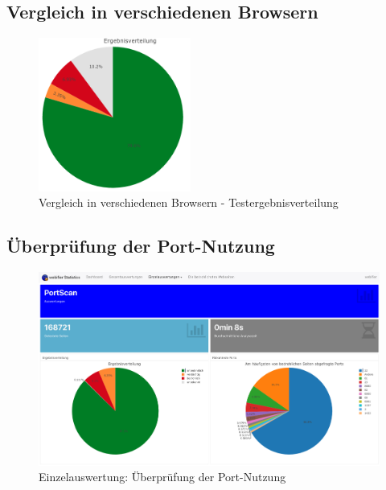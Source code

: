\subsection{Vergleich in verschiedenen Browsern}
\begin{figure}[H]
  \centering
  \includegraphics[width=5cm]{images/stats/diaheaderinspection}
  \caption{Vergleich in verschiedenen Browsern - Testergebnisverteilung}
  \label{fig:analyse-diaheaderinspection}
\end{figure}

\subsection{Überprüfung der Port-Nutzung}
\begin{figure}[H]
  \centering
  \includegraphics[width=15cm]{images/stats/portscan}
  \caption{Einzelauswertung: Überprüfung der Port-Nutzung\protect\footnotemark}
  \label{fig:analyse-portscan}
\end{figure}

